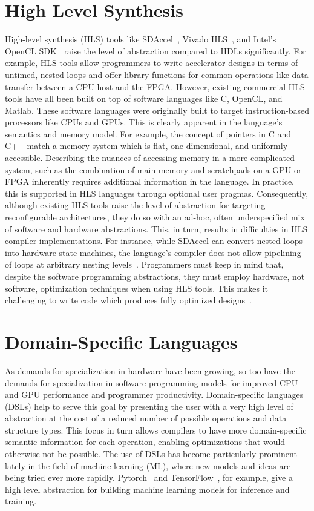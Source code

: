 \section{High Level Synthesis}
High-level synthesis (HLS) tools like SDAccel~\cite{sdaccel}, Vivado HLS~\cite{vivadohls},
and Intel's OpenCL SDK~\cite{opencl_sdk} raise the level of abstraction compared to HDLs significantly.
For example, HLS tools allow programmers to write accelerator designs in terms of untimed, nested loops
and offer library functions for common operations like data transfer between a CPU host and the FPGA.
However, existing commercial HLS tools have all been built on top of software languages like C, OpenCL, and Matlab.
These software languages were originally built to target instruction-based processors like CPUs and GPUs.
This is clearly apparent in the language's semantics and memory model.
For example, the concept of pointers in C and C++ match a memory system which is flat, one dimensional, and uniformly accessible.
Describing the nuances of accessing memory in a more complicated system, such as the combination of main memory and
scratchpads on a GPU or FPGA inherently requires additional information in the language.
In practice, this is supported in HLS languages through optional user pragmas.
Consequently, although existing HLS tools raise the level of abstraction for targeting reconfigurable architectures,
they do so with an ad-hoc, often underspecified mix of software and hardware abstractions.
This, in turn, results in difficulties in HLS compiler implementations.
For instance, while SDAccel can convert nested loops into hardware state machines,
the language's compiler does not allow pipelining of loops at arbitrary nesting levels~\cite{vivado_userguide}.
Programmers must keep in mind that, despite the software programming abstractions, they must employ hardware, not software, optimization techniques when using HLS tools.
This makes it challenging to write code which produces fully optimized designs~\cite{nane2016survey}.


\section{Domain-Specific Languages}
As demands for specialization in hardware have been growing, so too have the demands for
specialization in software programming models for improved CPU and GPU performance and programmer productivity.
Domain-specific languages (DSLs) help to serve this goal by presenting the user with a very high level of abstraction
at the cost of a reduced number of possible operations and data structure types.
This focus in turn allows compilers to have more domain-specific semantic information
for each operation, enabling optimizations that would otherwise not be possible.
The use of DSLs has become particularly prominent lately in the field of machine learning (ML),
where new models and ideas are being tried ever more rapidly. Pytorch~\cite{pytorch} and TensorFlow~\cite{tensorflow},
for example, give a high level abstraction for building machine learning models for inference and training.

